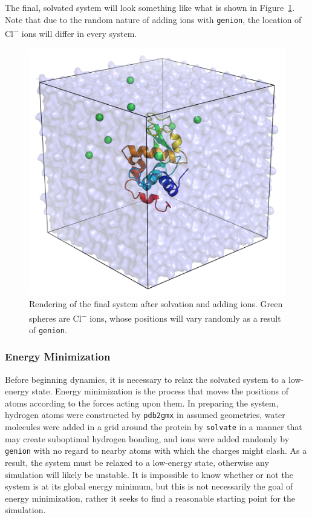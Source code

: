 \documentclass[9pt,tutorial]{livecoms}
\begin{document}
The final, solvated system will look something like what is shown in Figure~\ref{lyso_solv_ions_fig}. Note that due to the random nature of adding ions with \texttt{genion}, the location of Cl\textsuperscript{$-$} ions will differ in every system.

\begin{figure}[h]
\centering
\includegraphics{1AKI_solv_ions}
\caption{Rendering of the final system after solvation and adding ions. Green spheres are Cl\textsuperscript{$-$} ions, whose positions will vary randomly as a result of \texttt{genion}.}
\label{lyso_solv_ions_fig}
\end{figure}

\subsubsection{Energy Minimization} \label{lyso_em}

Before beginning dynamics, it is necessary to relax the solvated system to a low-energy state. Energy minimization is the process that moves the positions of atoms according to the forces acting upon them. In preparing the system, hydrogen atoms were constructed by \texttt{pdb2gmx} in assumed geometries, water molecules were added in a grid around the protein by \texttt{solvate} in a manner that may create suboptimal hydrogen bonding, and ions were added randomly by \texttt{genion} with no regard to nearby atoms with which the charges might clash. As a result, the system must be relaxed to a low-energy state, otherwise any simulation will likely be unstable. It is impossible to know whether or not the system is at its global energy minimum, but this is not necessarily the goal of energy minimization, rather it seeks to find a reasonable starting point for the simulation.
\end{document}
